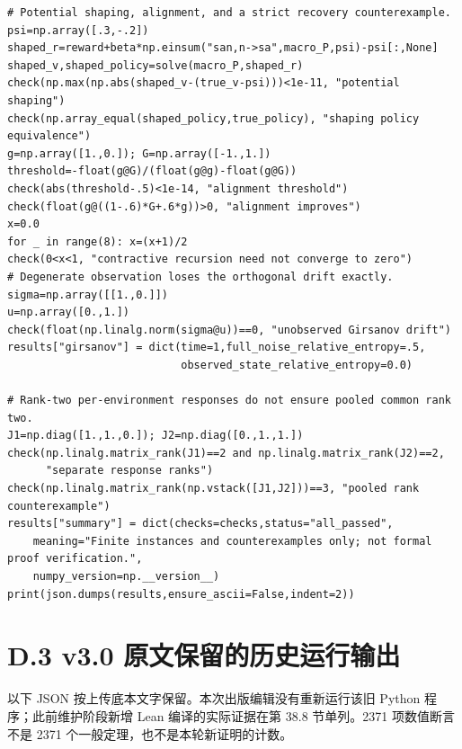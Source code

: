 \documentclass[
  11pt,
  oneside]{book}
\begin{document}
\begin{verbatim}
# Potential shaping, alignment, and a strict recovery counterexample.
psi=np.array([.3,-.2])
shaped_r=reward+beta*np.einsum("san,n->sa",macro_P,psi)-psi[:,None]
shaped_v,shaped_policy=solve(macro_P,shaped_r)
check(np.max(np.abs(shaped_v-(true_v-psi)))<1e-11, "potential shaping")
check(np.array_equal(shaped_policy,true_policy), "shaping policy equivalence")
g=np.array([1.,0.]); G=np.array([-1.,1.])
threshold=-float(g@G)/(float(g@g)-float(g@G))
check(abs(threshold-.5)<1e-14, "alignment threshold")
check(float(g@((1-.6)*G+.6*g))>0, "alignment improves")
x=0.0
for _ in range(8): x=(x+1)/2
check(0<x<1, "contractive recursion need not converge to zero")
# Degenerate observation loses the orthogonal drift exactly.
sigma=np.array([[1.,0.]])
u=np.array([0.,1.])
check(float(np.linalg.norm(sigma@u))==0, "unobserved Girsanov drift")
results["girsanov"] = dict(time=1,full_noise_relative_entropy=.5,
                           observed_state_relative_entropy=0.0)

# Rank-two per-environment responses do not ensure pooled common rank two.
J1=np.diag([1.,1.,0.]); J2=np.diag([0.,1.,1.])
check(np.linalg.matrix_rank(J1)==2 and np.linalg.matrix_rank(J2)==2,
      "separate response ranks")
check(np.linalg.matrix_rank(np.vstack([J1,J2]))==3, "pooled rank counterexample")
results["summary"] = dict(checks=checks,status="all_passed",
    meaning="Finite instances and counterexamples only; not formal proof verification.",
    numpy_version=np.__version__)
print(json.dumps(results,ensure_ascii=False,indent=2))
\end{verbatim}

\section{D.3 v3.0 原文保留的历史运行输出}\label{d.3-v3.0-ux539fux6587ux4fddux7559ux7684ux5386ux53f2ux8fd0ux884cux8f93ux51fa}

以下 JSON 按上传底本文字保留。本次出版编辑没有重新运行该旧 Python 程序；此前维护阶段新增 Lean 编译的实际证据在第 38.8 节单列。2371 项数值断言不是 2371 个一般定理，也不是本轮新证明的计数。
\end{document}
